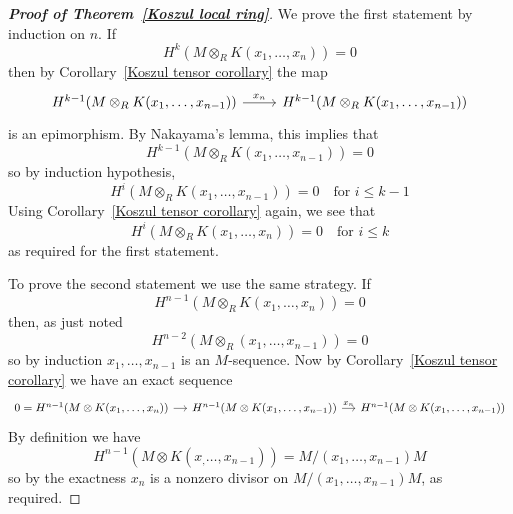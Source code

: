 \begin{proof}[\textbf{Proof of Theorem~\ref{Koszul local ring}}]
We prove the first statement by induction on $n$. If \[H^k(M\otimes_RK(x_1,\dots,x_n))=0\]
then by Corollary~\ref{Koszul tensor corollary} the map
\[\begin{tikzcd}
H^{k-1}(M\otimes_RK(x_1,\dots,x_{n-1}))\ar[r,"x_n"]&H^{k-1}(M\otimes_RK(x_1,\dots,x_{n-1}))
\end{tikzcd}\]
is an epimorphism. By Nakayama's lemma, this implies that
\[H^{k-1}(M\otimes_RK(x_1,\dots,x_{n-1}))=0\]
so by induction hypothesis,
\[H^{i}(M\otimes_RK(x_1,\dots,x_{n-1}))=0\quad\text{for }i\leq k-1\]
Using Corollary~\ref{Koszul tensor corollary} again, we see that
\[H^{i}(M\otimes_RK(x_1,\dots,x_{n}))=0\quad\text{for }i\leq k\]
as required for the first statement.\par
To prove the second statement we use the same strategy. If
\[H^{n-1}(M\otimes_RK(x_1,\dots,x_n))=0\]
then, as just noted
\[H^{n-2}(M\otimes_R(x_1,\dots,x_{n-1}))=0\]
so by induction $x_1,\dots,x_{n-1}$ is an $M$-sequence. Now by Corollary~\ref{Koszul tensor corollary} we have an exact sequence
\[\begin{tikzcd}[column sep=small]
0=H^{n-1}(M\otimes K(x_1,\dots,x_n))\ar[r]&H^{n-1}(M\otimes K(x_1,\dots,x_{n-1}))\ar[r,"x_n"]&H^{n-1}(M\otimes K(x_1,\dots,x_{n-1}))
\end{tikzcd}\]
By definition we have
\[H^{n-1}(M\otimes K(x_,\dots,x_{n-1}))=M/(x_1,\dots,x_{n-1})M\]
so by the exactness $x_n$ is a nonzero divisor on $M/(x_1,\dots,x_{n-1})M$, as required.
\end{proof}
